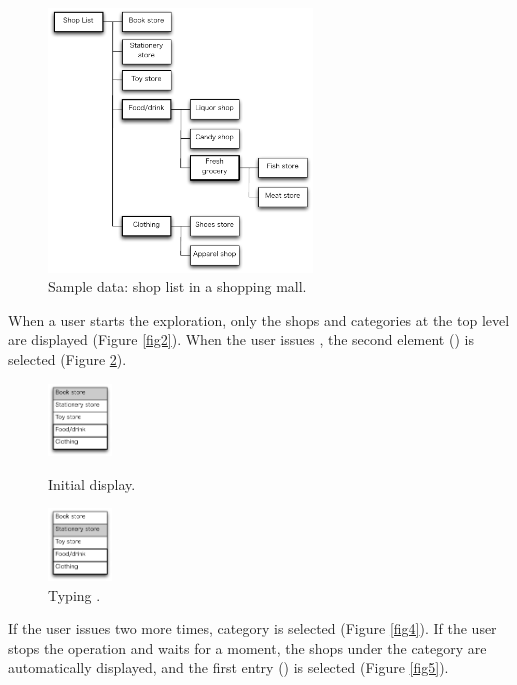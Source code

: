 \documentclass[conference]{IEEEtran}
\def\down{\tsf{▼}}
\begin{document}
\begin{figure}[H]
  \centerline{\includegraphics[width=70mm,bb=0 0 490 490]{figures/fig1.pdf}}
  \caption{Sample data: shop list in a shopping mall.}
  \label{fig1}
\end{figure}

When a user starts the exploration, only the shops and categories
at the top level are displayed (Figure \ref{fig2}).
When the user issues {\down},
the second element () is selected (Figure \ref{fig3}).

\def\menuwidth{22mm}

\begin{figure}[H]
  \begin{minipage}{0.45\hsize}
    \centerline{\includegraphics[width=17mm, bb=0 0 139 157]{figures/fig2.pdf}}
    \caption{Initial display.}
    \label{fig2}
  \end{minipage}
  \begin{minipage}{0.45\hsize}
    \centerline{\includegraphics[width=17mm,bb=0 0 139 157]{figures/fig3.pdf}}
    \caption{Typing {\down}.}
    \label{fig3}
  \end{minipage}
\end{figure}

If the user issues {\down} two more times, 
 category is selected (Figure \ref{fig4}).
If the user stops the operation and waits for a moment, the shops under the 
category are automatically displayed,
and the first entry () is selected (Figure \ref{fig5}).
\end{document}
